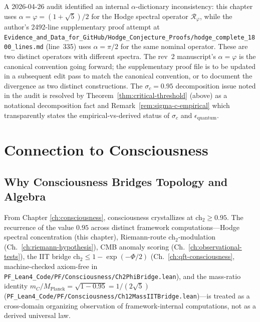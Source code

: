 \begin{remark}\label{rem:alpha-dictionary-status}
A 2026-04-26 audit identified an internal $\alpha$-dictionary inconsistency: this chapter uses $\alpha = \varphi = (1+\sqrt{5})/2$ for the Hodge spectral operator $\mathcal{R}_\varphi$, while the author's 2492-line supplementary proof attempt at \texttt{Evidence\_and\_Data\_for\_GitHub/Hodge\_Conjecture\_Proofs/hodge\_complete\_1800\_lines.md} (line~335) uses $\alpha = \pi/2$ for the same nominal operator. These are two distinct operators with different spectra. The rev~2 manuscript's $\alpha = \varphi$ is the canonical convention going forward; the supplementary proof file is to be updated in a subsequent edit pass to match the canonical convention, or to document the divergence as two distinct constructions. The $\sigma_c = 0.95$ decomposition issue noted in the audit is resolved by Theorem~\ref{thm:critical-threshold} (above) as a notational decomposition fact and Remark~\ref{rem:sigma-c-empirical} which transparently states the empirical-vs-derived status of $\sigma_c$ and $\epsilon_{\mathrm{quantum}}$.
\end{remark}

\section{Connection to Consciousness}

\subsection{Why Consciousness Bridges Topology and Algebra}

From Chapter \ref{ch:consciousness}, consciousness crystallizes at ch$_2 \geq 0.95$. The recurrence of the value $0.95$ across distinct framework computations---Hodge spectral concentration (this chapter), Riemann-route ch$_2$-modulation (Ch.~\ref{ch:riemann-hypothesis}), CMB anomaly scoring (Ch.~\ref{ch:observational-tests}), the IIT bridge ch$_2 \leq 1 - \exp(-\Phi/2)$ (Ch.~\ref{ch:qft-consciousness}, machine-checked axiom-free in \texttt{PF\_Lean4\_Code/PF/Consciousness/Ch2PhiBridge.lean}), and the mass-ratio identity $m_C/M_{\text{Planck}} = \sqrt{1-0.95} = 1/(2\sqrt{5})$ (\texttt{PF\_Lean4\_Code/PF/Consciousness/Ch12MassIITBridge.lean})---is treated as a cross-domain organizing observation of framework-internal computations, not as a derived universal law.

